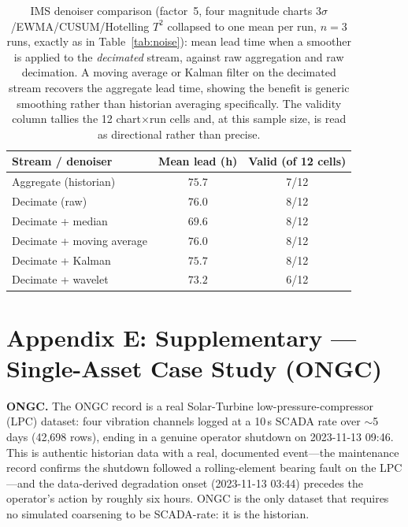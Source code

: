 \documentclass[journal]{IEEEtran}
\begin{document}
\begin{table}[t]
\caption{IMS denoiser comparison (factor~5, four magnitude charts
3$\sigma$/EWMA/CUSUM/Hotelling $T^2$ collapsed to one mean per run,
$n{=}3$ runs, exactly as in Table~\ref{tab:noise}): mean lead time when a smoother
is applied to the \emph{decimated} stream, against raw aggregation and raw
decimation. A moving average or Kalman filter on the decimated stream recovers the
aggregate lead time, showing the benefit is generic smoothing rather than historian
averaging specifically. The validity column tallies the 12 chart$\times$run cells
and, at this sample size, is read as directional rather than precise.}
\label{tab:denoise}
\centering
\footnotesize
\begin{tabular}{@{}lcc@{}}
\toprule
Stream / denoiser & Mean lead (h) & Valid (of 12 cells) \\
\midrule
Aggregate (historian)        & $75.7$ & 7/12 \\
Decimate (raw)               & $76.0$ & 8/12 \\
Decimate + median            & $69.6$ & 8/12 \\
Decimate + moving average    & $76.0$ & 8/12 \\
Decimate + Kalman            & $75.7$ & 8/12 \\
Decimate + wavelet           & $73.2$ & 6/12 \\
\bottomrule
\end{tabular}
\end{table}

\section*{Appendix E: Supplementary --- Single-Asset Case Study (ONGC)}
\label{app:ongc}
\textbf{ONGC.} The ONGC record is a real Solar-Turbine low-pressure-compressor
(LPC) dataset: four vibration channels logged at a 10\,s SCADA rate over
$\sim$5 days (42{,}698 rows), ending in a genuine operator shutdown on
2023-11-13 09:46. This is authentic historian data with a real, documented
event---the maintenance record confirms the shutdown followed a rolling-element
bearing fault on the LPC---and the data-derived degradation onset
(2023-11-13 03:44) precedes the operator's action by roughly six hours. ONGC is
the only dataset that requires no simulated coarsening to be SCADA-rate: it is
the historian.
\end{document}
